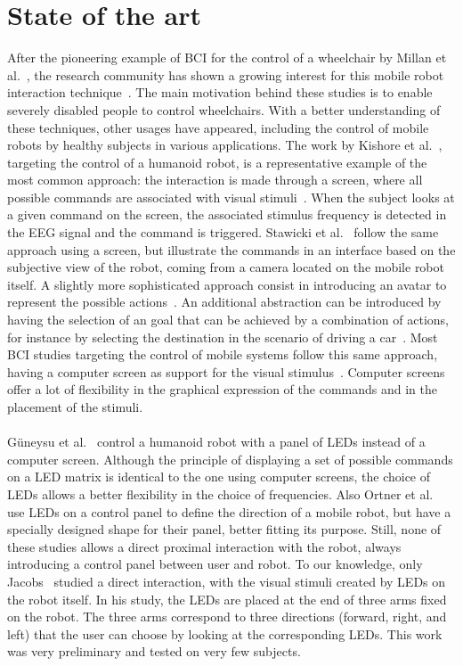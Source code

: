 \documentclass[smallextended]{svjour3}
\begin{document}
\section{State of the art}
\label{sec:soa}
After the pioneering example of BCI for the control of a wheelchair by Millan et al.~\cite{millan2004noninvasive}, the research community has shown a growing interest for this mobile robot interaction technique~\cite{Bi2013}. The main motivation behind these studies is to enable severely disabled people to control wheelchairs. With a better understanding of these techniques, other usages have appeared, including the control of mobile robots by healthy subjects in various applications. The work by Kishore et al.~\cite{kishore2014comparison}, targeting the control of a humanoid robot, is a representative example of the most common approach: the interaction is made through a screen, where all possible commands are associated with visual stimuli~\cite{Volosyak2009}. When the subject looks at a given command on the screen, the associated stimulus frequency is detected in the EEG signal and the command is triggered. Stawicki et al.~\cite{Stawicki2016} follow the same approach using a screen, but illustrate the commands in an interface based on the subjective view of the robot, coming from a camera located on the mobile robot itself. A slightly more sophisticated approach consist in introducing an avatar to represent the possible actions~\cite{Faller2010}. An additional abstraction can be introduced by having the selection of an goal that can be achieved by a combination of actions, for instance by selecting the destination in the scenario of driving a car~\cite{Fan2015}. Most BCI studies targeting the control of mobile systems follow this same approach, having a computer screen as support for the visual stimulus~\cite{Bi2013}. Computer screens offer a lot of flexibility in the graphical expression of the commands and in the placement of the stimuli. \\
\\
G{\"{u}}neysu et al.~\cite{Guneysu2013} control a humanoid robot with a panel of LEDs instead of a computer screen. Although the principle of displaying a set of possible commands on a LED matrix is identical to the one using computer screens, the choice of LEDs allows a better flexibility in the choice of frequencies. Also Ortner et al.~\cite{Ortner2010} use LEDs on a control panel to define the direction of a mobile robot, but have a specially designed shape for their panel, better fitting its purpose. Still, none of these studies allows a direct proximal interaction with the robot, always introducing a control panel between user and robot. To our knowledge, only Jacobs~\cite{Jacobs2013} studied a direct interaction, with the visual stimuli created by LEDs on the robot itself. In his study, the LEDs are placed at the end of three arms fixed on the robot. The three arms correspond to three directions (forward, right, and left) that the user can choose by looking at the corresponding LEDs. This work was very preliminary and tested on very few subjects.\\
\end{document}
